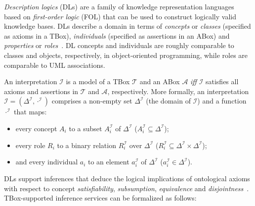 \emph{Description logics} (DLs) are a family of knowledge representation languages based on \emph{first-order logic} (FOL) that can be used to construct logically valid knowledge bases. DLs describe a domain in terms of \emph{concepts} or \emph{classes} (specified as axioms in a TBox), \emph{individuals} (specified as assertions in an ABox) and \emph{properties} or \emph{roles}~\cite{Horrocks_2011}. DL concepts and individuals are roughly comparable to classes and objects, respectively, in object-oriented programming, while roles are comparable to UML associations.

An interpretation $\mathcal{I}$ is a model of a TBox $\mathcal{T}$ and an ABox $\mathcal{A}$ \emph{iff} $\mathcal{I}$ satisfies all axioms and assertions in $\mathcal{T}$ and $\mathcal{A}$, respectively. More formally, an interpretation $\mathcal{I} = (\Delta^\mathcal{I}, \cdot^\mathcal{I})$ comprises a non-empty set $\Delta^\mathcal{I}$ (the domain of $\mathcal{I}$) and a function $\cdot^\mathcal{I}$ that maps:

\begin{itemize}

\item every concept $A_i$ to a subset $A_i^\mathcal{I}$ of $\Delta^\mathcal{I}$ ($A_i^\mathcal{I} \subseteq \Delta^\mathcal{I}$);

\item every role $R_i$ to a binary relation $R_i^\mathcal{I}$ over $\Delta^\mathcal{I}$ ($R_i^\mathcal{I} \subseteq \Delta^\mathcal{I} \times \Delta^\mathcal{I}$);

\item and every individual $a_i$ to an element $a_i^\mathcal{I}$ of $\Delta^\mathcal{I}$ ($a_i^\mathcal{I} \in \Delta^\mathcal{I}$).

\end{itemize}

DLs support inferences that deduce the logical implications of ontological axioms with respect to concept \emph{satisfiability}, \emph{subsumption}, \emph{equivalence} and \emph{disjointness}~\cite{Baader_2005}. TBox-supported inference services can be formalized as follows:

